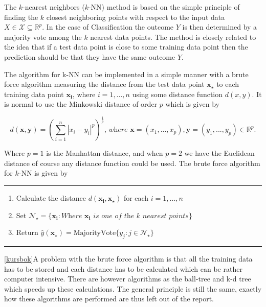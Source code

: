 \documentclass[../../project.tex]{subfiles}
\begin{document}
	The $k$-nearest neighbors ($k$-NN) method is based on the simple principle of finding the $k$ closest neighboring points with respect to the input data $X \in \mathcal{X} \subseteq \mathbb{R}^p$. In the case of Classification the outcome $Y$ is then determined by a majority vote among the $k$ nearest data points. The method is closely related to the idea that if a test data point is close to some training data point then the prediction should be that they have the same outcome $Y$.
	
	The algorithm for k-NN can be implemented in a simple manner with a brute force algorithm measuring the distance from the test data point $\boldsymbol{x_{\star}}$ to each training data point $\boldsymbol{x_{i}}$, where $i = 1,...,n$ using some distance function $d(x,y)$. It is normal to use the Minkowski distance of order $p$ which is given by
	
	\begin{equation}
	d(\boldsymbol{x},\boldsymbol{y}) = \left( \sum_{i=1}^{n} |x_{i} - y_{i}|^{p} \right)^{\frac{1}{p}}\textit{, where } \boldsymbol{x} = (x_1,...,x_p),\boldsymbol{y}=(y_1,...,y_p)
	\in \mathbb{R}^p.
	\end{equation}
	
	Where $p=1$ is the Manhattan distance, and when $p=2$ we have the Euclidean distance of course any distance function could be used.
	The brute force algorithm for $k$-NN is given by 
	\par\noindent\rule{\textwidth}{0.4pt}
	\begin{enumerate}
		\item Calculate the distance $d(\boldsymbol{x_{i}},\boldsymbol{x_{\star}})$ for each $i = 1,...,n$
		\item Set $\mathcal{N}_{\star} = \{ \boldsymbol{x_i}: \textit{Where } \boldsymbol{x_i} \textit{ is one of the k nearest points} \}$
		\item Return $\hat{y}(\boldsymbol{x_{\star}}) = \text{MajorityVote}\{y_j : j \in \mathcal{N}_{\star}\} $
	\end{enumerate}
	\par\noindent\rule{\textwidth}{0.4pt}
	
	\ref{kursbok}A problem with the brute force algorithm is that all the training data has to be stored and each distance has to be calculated which can be rather computer intensive. There are however algorithms as the ball-tree and k-d tree which speeds up these calculations. The general principle is still the same, exactly how these algorithms are performed are thus left out of the report.
	
\end{document}
